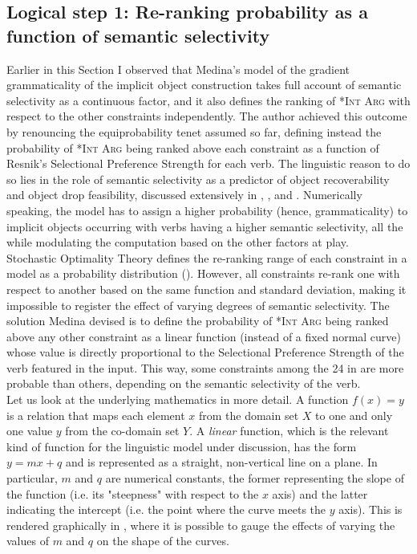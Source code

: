 \subsection{Logical step 1: Re-ranking probability as a function of semantic selectivity} Earlier in this Section I observed that Medina's model of the gradient grammaticality of the implicit object construction takes full account of semantic selectivity as a continuous factor, and it also defines the ranking of \textsc{*Int Arg} with respect to the other constraints independently. The author achieved this outcome by renouncing the equiprobability tenet assumed so far, defining instead the probability of \textsc{*Int Arg} being ranked above each constraint as a function of Resnik's Selectional Preference Strength \parencite{Resnik1993,Resnik1996} for each verb. The linguistic reason to do so lies in the role of semantic selectivity as a predictor of object recoverability and object drop feasibility, discussed extensively in , , and . Numerically speaking, the model has to assign a higher probability (hence, grammaticality) to implicit objects occurring with verbs having a higher semantic selectivity, all the while modulating the computation based on the other factors at play.\\
Stochastic Optimality Theory defines the re-ranking range of each constraint in a model as a probability distribution (). However, all constraints re-rank one with respect to another based on the same function and standard deviation, making it impossible to register the effect of varying degrees of semantic selectivity. The solution Medina devised \parencite[94]{Medina2007} is to define the
probability of \textsc{*Int Arg} being ranked above any other constraint as a linear function (instead of a fixed normal curve) whose value is directly proportional to the Selectional Preference Strength of the verb featured in the input. This way, some constraints among the 24 in  are more probable than others, depending on the semantic selectivity of the verb.\\
Let us look at the underlying mathematics in more detail. A function $f(x) = y$ is a relation that maps each element $x$ from the domain set $X$ to one and only one value $y$ from the co-domain set $Y$. A \textit{linear} function, which is the relevant kind of function for the linguistic model under discussion, has the form $y = mx + q$ and is represented as a straight, non-vertical line on a plane. In particular, $m$ and $q$ are numerical constants, the former representing the slope of the function (i.e. its "steepness" with respect to the $x$ axis) and the latter indicating the intercept (i.e. the point where the curve meets the $y$ axis). This is rendered graphically in , where it is possible to gauge the effects of varying the values of $m$ and $q$ on the shape of the curves.

